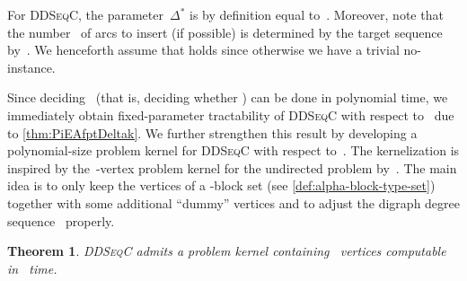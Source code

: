 \documentclass[a4paper,11pt]{article}
\theoremstyle{remark}
\theoremstyle{plain}
\newtheorem{theorem}{Theorem}
\theoremstyle{definition}
\newcommand{\DDSC}{\textsc{DDSeqC}\xspace}
\newcommand{\degpara}{\ensuremath{\Delta^*}\xspace}
\begin{document}
For \DDSC, the parameter~\degpara is by definition equal to~.
Moreover, note that the number~ of arcs to insert (if possible) is determined by the target sequence~ by~.
We henceforth assume that 
holds since otherwise we have a trivial no-instance.

Since deciding~ (that is, deciding whether ) can be done in polynomial time, we immediately obtain fixed-parameter tractability of \DDSC with respect to~ due to \cref{thm:PiEAfptDeltak}.
We further strengthen this result by developing a polynomial-size problem kernel for \DDSC with respect to~.
The kernelization is inspired by the~-vertex problem kernel for the undirected problem by~\citet{GM17}.
The main idea is to only keep the vertices of a -block set (see \cref{def:alpha-block-type-set}) together with some additional ``dummy'' vertices and to adjust the digraph degree sequence~ properly.










\begin{theorem}
  \label{thm:DDSC_kDelta-kernel}
  \DDSC admits a problem kernel containing~ vertices computable in~ time.
\end{theorem}
\end{document}
